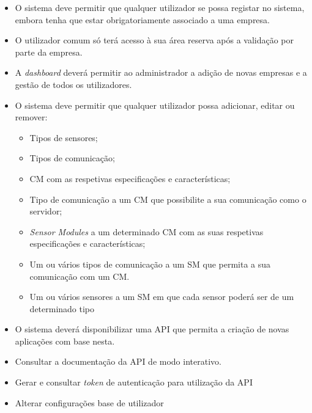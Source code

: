 \begin{itemize}
	\item O sistema deve permitir que qualquer utilizador se possa registar no sistema, embora tenha que estar obrigatoriamente associado a uma empresa.
	
	\item O utilizador comum só terá acesso à sua área reserva após a validação por parte da empresa.
	
	\item A \textit{dashboard} deverá permitir ao administrador a adição de novas empresas e a gestão de todos os utilizadores. 
	
	
	\item O sistema deve permitir que qualquer utilizador possa adicionar, editar ou remover: 
	\begin{itemize}
		\item Tipos de sensores; 
		
		\item Tipos de comunicação;
		
		\item \acl{CM} com as respetivas especificações e características;
		
		\item Tipo de comunicação a um \acl{CM} que possibilite a sua comunicação como o servidor; 
		
		\item  \textit{Sensor Modules} a um determinado \acl{CM} com as suas respetivas especificações e características; 
		
		\item Um ou vários tipos de comunicação a um \acl{SM} que permita a sua comunicação com um \acl{CM}. 
		
		
		\item Um ou vários sensores a um \acl{SM} em que cada sensor poderá ser de um determinado tipo
	\end{itemize}
	
		
	\item O sistema deverá disponibilizar uma \ac{API} que permita a criação de novas aplicações com base nesta. 
	
	\item Consultar a documentação da \ac{API} de modo interativo. 
	
	\item Gerar e consultar  \textit{token} de autenticação para utilização da \ac{API} 
	
	\item Alterar configurações base de utilizador 
	
\end{itemize}
	


